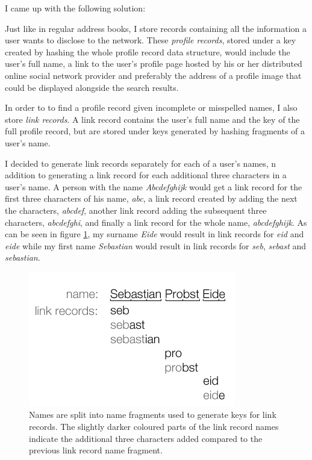 I came up with the following solution:

Just like in regular address books, I store records containing all the information a user wants to disclose to the network. These \emph{profile records}, stored under a key created by hashing the whole profile record data structure, would include the user's full name, a link to the user's profile page hosted by his or her distributed online social network provider and preferably the address of a profile image that could be displayed alongside the search results.

In order to to find a profile record given incomplete or misspelled names, I also store \emph{link records}. A link record contains the user's full name and the key of the full profile record, but are stored under keys generated by hashing fragments of a user's name. 

I decided to generate link records separately for each of a user's names, n addition to generating a link record for each additional three characters in a user's name. A person with the name \emph{Abcdefghijk} would get a link record for the first three characters of his name, \emph{abc}, a link record created by adding the next the characters, \emph{abcdef}, another link record adding the subsequent three characters, \emph{abcdefghi}, and finally a link record for the whole name, \emph{abcdefghijk}.
As can be seen in figure \ref{figLinkRecord}, my surname \emph{Eide} would result in link records for \emph{eid} and \emph{eide} while my first name \emph{Sebastian} would result in link records for \emph{seb}, \emph{sebast} and \emph{sebastian}.

\begin{figure}[!htb]
\begin{center}
	\includegraphics[width=0.6\linewidth]{illustrations/LinkRecords.png}
  \caption{Names are split into name fragments used to generate keys for link records. The slightly darker coloured parts of the link record names indicate the additional three characters added compared to the previous link record name fragment.}
  \label{figLinkRecord}
\end{center}
\end{figure}


